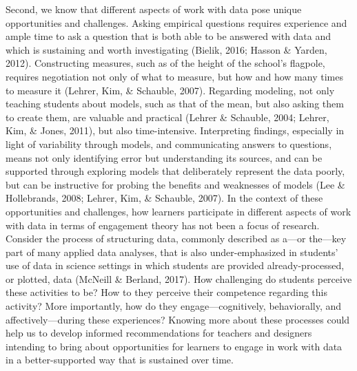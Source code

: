 \documentclass[]{msu-thesis}
\theoremstyle{definition}
\theoremstyle{definition}
\theoremstyle{definition}
\theoremstyle{remark}
\begin{document}
Second, we know that different aspects of work with data pose unique
opportunities and challenges. Asking empirical questions requires
experience and ample time to ask a question that is both able to be
answered with data and which is sustaining and worth investigating
(Bielik, 2016; Hasson \& Yarden, 2012). Constructing measures, such as
of the height of the school's flagpole, requires negotiation not only of
what to measure, but how and how many times to measure it (Lehrer, Kim,
\& Schauble, 2007). Regarding modeling, not only teaching students about
models, such as that of the mean, but also asking them to create them,
are valuable and practical (Lehrer \& Schauble, 2004; Lehrer, Kim, \&
Jones, 2011), but also time-intensive. Interpreting findings, especially
in light of variability through models, and communicating answers to
questions, means not only identifying error but understanding its
sources, and can be supported through exploring models that deliberately
represent the data poorly, but can be instructive for probing the
benefits and weaknesses of models (Lee \& Hollebrands, 2008; Lehrer,
Kim, \& Schauble, 2007). In the context of these opportunities and
challenges, how learners participate in different aspects of work with
data in terms of engagement theory has not been a focus of research.
Consider the process of structuring data, commonly described as a---or
the---key part of many applied data analyses, that is also
under-emphasized in students' use of data in science settings in which
students are provided already-processed, or plotted, data (McNeill \&
Berland, 2017). How challenging do students perceive these activities to
be? How to they perceive their competence regarding this activity? More
importantly, how do they engage---cognitively, behaviorally, and
affectively---during these experiences? Knowing more about these
processes could help us to develop informed recommendations for teachers
and designers intending to bring about opportunities for learners to
engage in work with data in a better-supported way that is sustained
over time.
\end{document}
